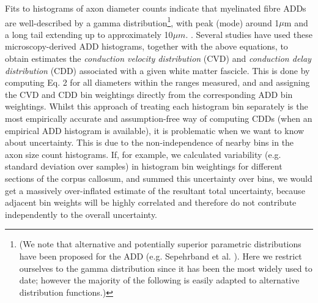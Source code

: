 
Fits to histograms of axon diameter counts indicate that myelinated fibre ADDs are well-described by a gamma distribution\footnote{(We note that alternative and potentially superior parametric distributions have been proposed for the ADD (e.g. Sepehrband et al. \citep{sepehrband2016parametric}). Here we restrict ourselves to the gamma distribution since it has been the most widely used to date; however the majority of the following is easily adapted to alternative distribution functions.)}, with peak (mode) around 1$\mu$m and a long tail extending up to approximately 10$\mu m$. \citep{aboitiz1992fiber}. Several studies have used these microscopy-derived ADD histograms, together with the above equations, to obtain estimates the \textit{conduction velocity distribution} (CVD) and \textit{conduction delay distribution} (CDD) associated with a given white matter fascicle. This is done by computing Eq. 2 for all diameters within the ranges measured, and and assigning the CVD and CDD bin weightings directly from the corresponding ADD bin weightings. Whilst this approach of treating each histogram bin separately is the most empirically accurate and assumption-free way of computing CDDs (when an empirical ADD histogram is available), it is problematic when we want to know about uncertainty. This is due to the non-independence of nearby bins in the axon size count histograms. If, for example, we calculated variability (e.g. standard deviation over samples) in histogram bin weightings for different sections of the corpus callosum, and summed this uncertainty over bins, we would get a massively over-inflated estimate of the resultant total uncertainty, because adjacent bin weights will be highly correlated and therefore do not contribute independently to the overall uncertainty. 
